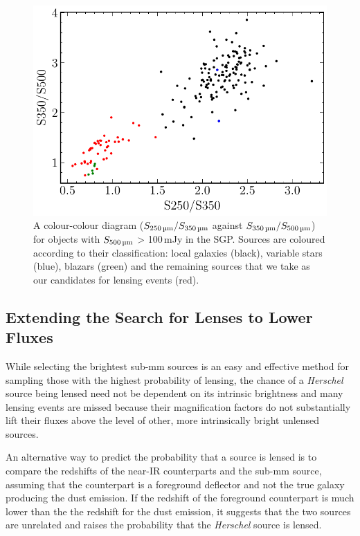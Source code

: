 \begin{figure}
    \centering
    \includegraphics[width=0.75\columnwidth]{Figures/submm_colours_lensed_candidates.pdf}
    \caption{A colour-colour diagram ($S_{\textrm{250\,\micron}}/S_{\textrm{350\,\micron}}$ against $S_{\textrm{350\,\micron}}/S_{\textrm{500\,\micron}}$) for objects with $S_{\textrm{500\,\micron}}$ > 100\,mJy in the SGP. Sources are coloured according to their classification: local galaxies (black), variable stars (blue), blazars (green) and the remaining sources that we take as our candidates for lensing events (red).}
    \label{fig:submm_colours_lensed_candidates}
\end{figure}

\subsection{Extending the Search for Lenses to Lower Fluxes}

While selecting the brightest sub-mm sources is an easy and effective method for sampling those with the highest probability of lensing, the chance of a \textit{Herschel} source being lensed need not be dependent on its intrinsic brightness and many lensing events are missed because their magnification factors do not substantially lift their fluxes above the level of other, more intrinsically bright unlensed sources.

An alternative way to predict the probability that a source is lensed is to compare the redshifts of the near-IR counterparts and the sub-mm source, assuming that the counterpart is a foreground deflector and not the true galaxy producing the dust emission. If the redshift of the foreground counterpart is much lower than the the redshift for the dust emission, it suggests that the two sources are unrelated and raises the probability that the \textit{Herschel} source is lensed.

